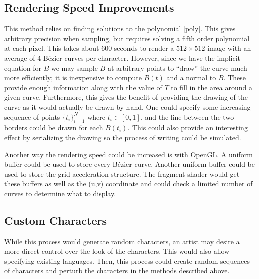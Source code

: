 \documentclass[12pt]{article}
\begin{document}
\subsection{Rendering Speed Improvements}
This method relies on finding solutions to the polynomial \eqref{poly}. This gives arbitrary precision when sampling, but requires solving a fifth order polynomial at each pixel. This takes about 600 seconds to render a $512 \times 512$ image with an average of 4 B\'ezier curves per character. However, since we have the implicit equation for $B$ we may sample $B$ at arbitrary points to ``draw'' the curve much more efficiently; it is inexpensive to compute $B(t)$ and a normal to $B$. These provide enough information along with the value of $T$ to fill in the area around a given curve. Furthermore, this gives the benefit of providing the drawing of the curve as it would actually be drawn by hand. One could specify some increasing sequence of points $\{t_i\}_{i=1}^N$ where $t_i \in [0,1]$, and the line between the two borders could be drawn for each $B(t_i)$. This could also provide an interesting effect by serializing the drawing so the process of writing could be simulated.

Another way the rendering speed could be increased is with OpenGL. A uniform buffer could be used to store every B\'ezier curve. Another uniform buffer could be used to store the grid acceleration structure. The fragment shader would get these buffers as well as the (u,v) coordinate and could check a limited number of curves to determine what to display.

\subsection{Custom Characters}
While this process would generate random characters, an artist may desire a more direct control over the look of the characters. This would also allow specifying existing languages. Then, this process could create random sequences of characters and perturb the characters in the methods described above.



\end{document}
